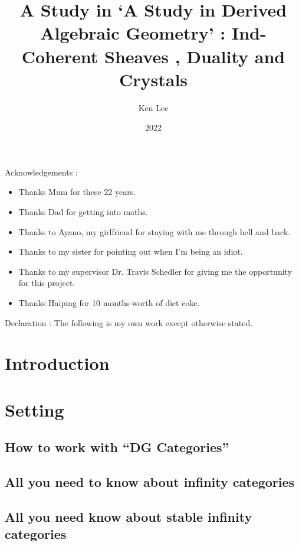 \documentclass{article}
\begin{document}
\title{A Study in `A Study in Derived Algebraic Geometry' : 
Ind-Coherent Sheaves , Duality and Crystals }

\author{Ken Lee}
\date{2022}
\maketitle

\tableofcontents

Acknowledgements : 
\begin{itemize}
  \item Thanks Mum for these 22 years.
  \item Thanks Dad for getting into maths.
  \item Thanks to Ayano, my girlfriend for staying with me through hell
  and back.
  \item Thanks to my sister for pointing out when I'm being an idiot.
  \item Thanks to my supervisor Dr. Travis Schedler for 
  giving me the opportunity for this project.
  \item Thanks Haiping for 10 months-worth of diet coke.
\end{itemize}

Declaration : The following is my own work except otherwise stated.

\section{Introduction}

  

\section{Setting}\label{setting}

  \subsection{How to work with ``DG Categories''}

  \subsection{All you need to know about infinity categories}
    

  \subsection{All you need know about stable infinity categories}
    
\end{document}
